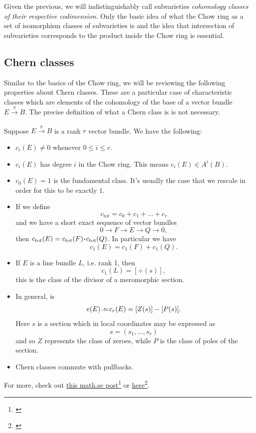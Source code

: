\documentclass[12pt]{memoir}
\begin{document}
Given the previous, we will indistinguishably call subvarieties \emph{cohomology classes of their respective codimension}. Only the basic idea of what the Chow ring as a set of isomorphism classes of subvarieties is and the idea that intersection of subvarieties corresponds to the product inside the Chow ring is essential.

\subsection{Chern classes}

Similar to the basics of the Chow ring, we will be reviewing the following properties about Chern classes. These are a particular case of characteristic classes which are elements of the cohomology of the base of a vector bundle $E\xrightarrow[]{\pi}B$. The precise definition of what a Chern class is is not necessary. 

\begin{Th}\label{th-chern-class-cheat-sheet}
    Suppose $E\xrightarrow{\pi}B$ is a rank $r$ vector bundle. We have the following:
\begin{itemize}
    \item $c_i(E)\neq 0$ whenever $0\leq i\leq r$.
    \item $c_i(E)$ has degree $i$ in the Chow ring. This means $c_i(E)\in A^i(B)$.%
    \item $c_0(E)=1$ is the fundamental class. It's usually the case that we rescale in order for this to be exactly $1$.
    \item If we define 
    $$c_{\text{tot}}=c_0+c_1+\dots+c_r$$
    and we have a short exact sequence of vector bundles 
    $$0\to F\to E\to Q\to 0,$$
    then $c_{\text{tot}}(E)=c_{\text{tot}}(F)\.c_{\text{tot}}(Q)$. In particular we have 
    $$c_1(E)=c_1(F)+c_1(Q).$$
    \item If $E$ is a line bundle $L$, i.e. rank 1, then 
    $$c_1(L)=[\div(s)],$$
    this is the class of the divisor of a meromorphic section.
    \item In general,  is
    $$e(E)\defeq c_r(E)=[Z(s)]-[P(s)].$$%
    Here $s$ is a section which in local coordinates may be expressed as 
    $$s=(s_1,...,s_r)$$
    and so $Z$ represents the class of zeroes, while $P$ is the class of poles of the section.
    \item Chern classes commute with pullbacks.
\end{itemize}

For more, check out \href{https://math.stackexchange.com/questions/989147/quick-question-chern-classes-of-sym-wedge-hom-and-tensor}{this math.se post}\footnote{\href{math.stackexchange.com/q/989147/}{}} or \href{https://rigtriv.wordpress.com/2009/11/03/chern-classes-part-1/}{here}\footnote{\href{https://rigtriv.wordpress.com/2009/11/03/chern-classes-part-1/}{}}.

\end{Th}
\end{document}
